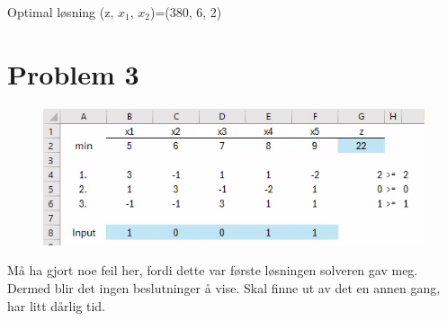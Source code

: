 \documentclass{article}
\begin{document}
Optimal løsning (z, $x_1$, $x_2$)=(380, 6, 2)

\section*{\textbf{Problem 3}}

\begin{figure}[ht]
    \includegraphics*[width=\linewidth]{img/task3.png}
\end{figure}

Må ha gjort noe feil her, fordi dette var første løsningen solveren gav meg. Dermed blir det ingen beslutninger å vise. 
Skal finne ut av det en annen gang, har litt dårlig tid.
\end{document}
